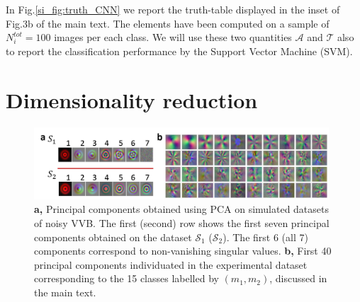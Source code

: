 \documentclass[
    floatfix, aps, pra, superscriptaddress,
	10pt, twocolumn,
    nofootinbib,
	tightenlines
]{revtex4-1}
\newcommand{\redComm}[1]{\textcolor{red}{\small[#1]}}
\begin{document}
In Fig.\ref{si_fig:truth_CNN} we report the truth-table displayed in the inset of Fig.3b of the main text. The elements have been computed on a sample of $N_{i}^{tot}=100$ images per each class. %
We will use these two quantities $\mathcal{A}$ and $\mathcal{T}$ also to report the classification performance by the Support Vector Machine (SVM).


\section{Dimensionality reduction}
\label{sec:dimensionality_reduction}

\begin{figure}[ht!]
    \centering
    \includegraphics[width=0.98\textwidth]{S1_fig.png}
    \caption{
        \textbf{a,}
        Principal components obtained using PCA on simulated datasets of noisy VVB. The first (second) row shows the first seven principal components obtained on the dataset $\mathcal S_1$ ($\mathcal S_2$). 
        The first 6 (all 7) components correspond to non-vanishing singular values.
        \textbf{b,} First 40 principal components individuated in the experimental dataset corresponding to the 15 classes labelled by $(m_1,m_2)$, discussed in the main text.%
    }
    \label{fig:S1}
\end{figure}
\end{document}
